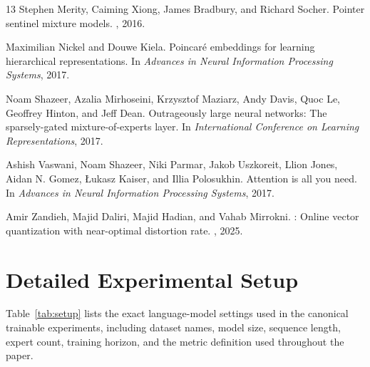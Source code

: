 \documentclass[10pt,twocolumn,letterpaper]{article}
\begin{document}
\begin{thebibliography}{13}
Stephen Merity, Caiming Xiong, James Bradbury, and Richard Socher.
\newblock Pointer sentinel mixture models.
, 2016.

Maximilian Nickel and Douwe Kiela.
\newblock Poincar{\'e} embeddings for learning hierarchical representations.
\newblock In {\em Advances in Neural Information Processing Systems}, 2017.

Noam Shazeer, Azalia Mirhoseini, Krzysztof Maziarz, Andy Davis, Quoc Le, Geoffrey Hinton, and Jeff Dean.
\newblock Outrageously large neural networks: The sparsely-gated mixture-of-experts layer.
\newblock In {\em International Conference on Learning Representations}, 2017.

Ashish Vaswani, Noam Shazeer, Niki Parmar, Jakob Uszkoreit, Llion Jones, Aidan N. Gomez, {\L}ukasz Kaiser, and Illia Polosukhin.
\newblock Attention is all you need.
\newblock In {\em Advances in Neural Information Processing Systems}, 2017.

Amir Zandieh, Majid Daliri, Majid Hadian, and Vahab Mirrokni.
: Online vector quantization with near-optimal distortion rate.
, 2025.

\end{thebibliography}

\balance
\clearpage
\onecolumn
\appendix

\section{Detailed Experimental Setup}
Table~\ref{tab:setup} lists the exact language-model settings used in the canonical trainable experiments, including dataset names, model size, sequence length, expert count, training horizon, and the metric definition used throughout the paper.

\begin{table}[H]
  \centering
  \caption{Exact experimental settings for the semantic proxy and trainable language-model analyses.}
  \label{tab:setup}
  \small
  
\end{table}
\end{document}
